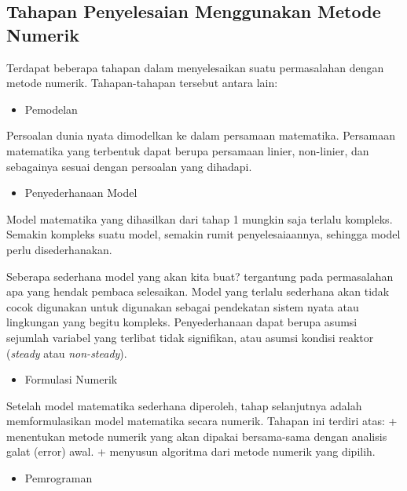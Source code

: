 \documentclass[
]{book}
\providecommand{\tightlist}{%
  \setlength{\itemsep}{0pt}\setlength{\parskip}{0pt}}
\theoremstyle{definition}
\theoremstyle{definition}
\theoremstyle{definition}
\theoremstyle{definition}
\theoremstyle{remark}
\begin{document}
\hypertarget{tahapan-penyelesaian-menggunakan-metode-numerik}{%
\subsection{Tahapan Penyelesaian Menggunakan Metode Numerik}\label{tahapan-penyelesaian-menggunakan-metode-numerik}}

Terdapat beberapa tahapan dalam menyelesaikan suatu permasalahan dengan metode numerik. Tahapan-tahapan tersebut antara lain:

\begin{itemize}
\tightlist
\item
  Pemodelan
\end{itemize}

Persoalan dunia nyata dimodelkan ke dalam persamaan matematika. Persamaan matematika yang terbentuk dapat berupa persamaan linier, non-linier, dan sebagainya sesuai dengan persoalan yang dihadapi.

\begin{itemize}
\tightlist
\item
  Penyederhanaan Model
\end{itemize}

Model matematika yang dihasilkan dari tahap 1 mungkin saja terlalu kompleks. Semakin kompleks suatu model, semakin rumit penyelesaiaannya, sehingga model perlu disederhanakan.

Seberapa sederhana model yang akan kita buat? tergantung pada permasalahan apa yang hendak pembaca selesaikan. Model yang terlalu sederhana akan tidak cocok digunakan untuk digunakan sebagai pendekatan sistem nyata atau lingkungan yang begitu kompleks. Penyederhanaan dapat berupa asumsi sejumlah variabel yang terlibat tidak signifikan, atau asumsi kondisi reaktor (\emph{steady} atau \emph{non-steady}).

\begin{itemize}
\tightlist
\item
  Formulasi Numerik
\end{itemize}

Setelah model matematika sederhana diperoleh, tahap selanjutnya adalah memformulasikan model matematika secara numerik. Tahapan ini terdiri atas:
+ menentukan metode numerik yang akan dipakai bersama-sama dengan analisis galat (error) awal.
+ menyusun algoritma dari metode numerik yang dipilih.

\begin{itemize}
\tightlist
\item
  Pemrograman
\end{itemize}
\end{document}
